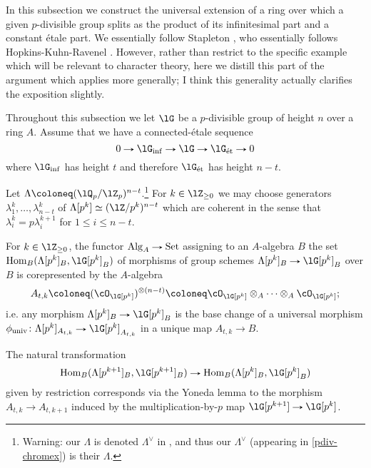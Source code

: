 In this subsection we construct the universal extension of a ring over
which a given $p$-divisible group splits as the product of its
infinitesimal part and a constant \'etale part. We essentially follow
Stapleton \cite[\S2.8]{stapleton-tgcm}, who essentially follows
Hopkins-Kuhn-Ravenel \cite[\S\S6.1--6.2]{hkr-char}. However, rather
than restrict to the specific example which will be relevant to
character theory, here we distill this part of the argument which
applies more generally; I think this generality actually clarifies the
exposition slightly.

\begin{notation}
  \label{pdiv-split-ntn}
  Throughout this subsection we let $\lG$ be a $p$-divisible group of
  height $n$ over a ring $A$. Assume that we have a connected-\'etale
  sequence
  \[
  0 \to \lG_\inf \to \lG \to \lG_\et \to 0
  \]
  where $\lG_\inf$ has height $t$ and therefore $\lG_\et$ has height
  $n-t$.

  Let $\Lambda \ce (\lQ_p/\lZ_p)^{n-t}$.\footnote{Warning: our
    $\Lambda$ is denoted $\Lambda^\vee$ in
    \cite{hkr-char,stapleton-tgcm}, and thus our $\Lambda^\vee$
    (appearing in \cref{pdiv-chromex}) is their $\Lambda$.} For
  $k \in \lZ_{\ge 0}$ we may choose generators
  $\lambda^k_1, \ldots, \lambda^k_{n-t}$ of
  $\Lambda[p^k] \iso (\lZ/p^k)^{n-t}$ which are coherent in the sense
  that $\lambda^k_i = p\lambda^{k+1}_i$ for $1 \le i \le n-t$.
\end{notation}

\begin{lemma}
  \label{pdiv-split-hom}
  For $k \in \lZ_{\ge 0}$, the functor $\Alg_A \to \Set$ assigning to
  an $A$-algebra $B$ the set $\Hom_B(\Lambda[p^k]_B, \lG[p^k]_B)$ of
  morphisms of group schemes $\Lambda[p^k]_B \to \lG[p^k]_B$ over $B$
  is corepresented by the $A$-algebra
  \[
  A_{t,k} \ce (\cO_{\lG[p^k]})^{\otimes(n-t)} \ce \cO_{\lG[p^k]}
  \otimes_A \cdots \otimes_A \cO_{\lG[p^k]};
  \]
  i.e. any morphism $\Lambda[p^k]_B \to \lG[p^k]_B$ is the base change
  of a universal morphism
  $\phi_\univ \c \Lambda[p^k]_{A_{t,k}} \to \lG[p^k]_{A_{t,k}}$ in a
  unique map $A_{t,k} \to B$.

  The natural transformation
  \[
  \Hom_B(\Lambda[p^{k+1}]_B,\lG[p^{k+1}]_B) \to
  \Hom_B(\Lambda[p^k]_B,\lG[p^k]_B)
  \]
  given by restriction corresponds via the Yoneda lemma to the
  morphism $A_{t,k} \to A_{t,k+1}$ induced by the
  multiplication-by-$p$ map $\lG[p^{k+1}] \to \lG[p^k]$.
\end{lemma}

